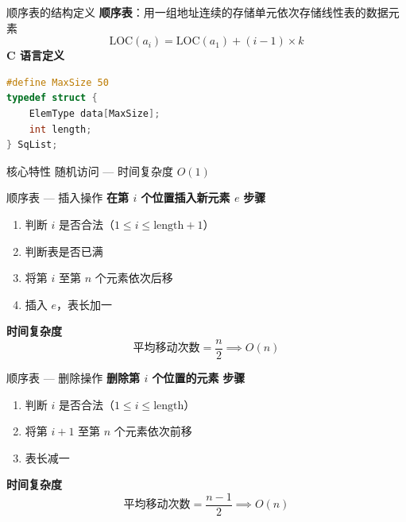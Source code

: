 \documentclass[10pt, aspectratio=169]{beamer}
\begin{document}
\begin{frame}[fragile]{顺序表的结构定义}
    \textbf{顺序表}：用一组地址连续的存储单元依次存储线性表的数据元素
    \[
    \text{LOC}(a_i) = \text{LOC}(a_1) + (i-1) \times k
    \]
    \vspace{0.5em}
    \textbf{C 语言定义}
    \begin{lstlisting}[language=C, basicstyle=\ttfamily\small]
#define MaxSize 50
typedef struct {
    ElemType data[MaxSize];
    int length;
} SqList;
    \end{lstlisting}
    \vspace{0.5em}
    \begin{block}{核心特性}
        随机访问 --- 时间复杂度 $O(1)$
    \end{block}
\end{frame}

\begin{frame}{顺序表 --- 插入操作}
    \textbf{在第 $i$ 个位置插入新元素 $e$}
    \vspace{0.3em}
    \textbf{步骤}
    \begin{enumerate}
        \item 判断 $i$ 是否合法（$1 \le i \le \text{length}+1$）
        \item 判断表是否已满
        \item 将第 $i$ 至第 $n$ 个元素依次后移
        \item 插入 $e$，表长加一
    \end{enumerate}
    \vspace{0.5em}
    \textbf{时间复杂度}
    \[
    \text{平均移动次数} = \frac{n}{2} \implies O(n)
    \]
\end{frame}

\begin{frame}{顺序表 --- 删除操作}
    \textbf{删除第 $i$ 个位置的元素}
    \vspace{0.3em}
    \textbf{步骤}
    \begin{enumerate}
        \item 判断 $i$ 是否合法（$1 \le i \le \text{length}$）
        \item 将第 $i+1$ 至第 $n$ 个元素依次前移
        \item 表长减一
    \end{enumerate}
    \vspace{0.5em}
    \textbf{时间复杂度}
    \[
    \text{平均移动次数} = \frac{n-1}{2} \implies O(n)
    \]
\end{frame}
\end{document}
